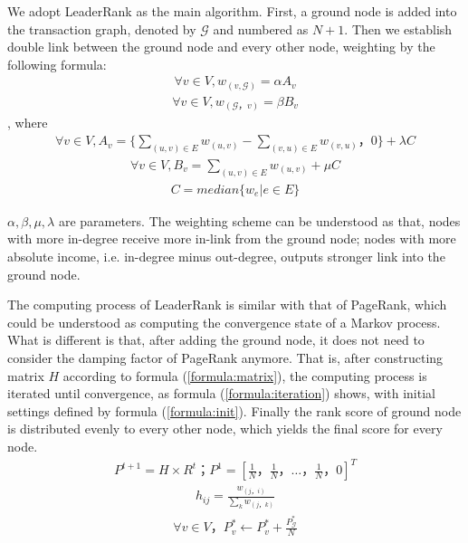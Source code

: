 We adopt LeaderRank\cite{Chen2013}\cite{Li2014} as the main algorithm. First, a ground node is added into the transaction graph, denoted by $\mathcal{G}$ and numbered as $N+1$. Then we establish double link between the ground node and every other node, weighting by the following formula:
\begin{align}\label{formula:weight1}
	\forall v \in V, w_{(v, \mathcal{G})} = \alpha A_v
\end{align}
\begin{align}\label{formula:weight2}
\forall v \in V,  w_{(\mathcal{G}， v)} = \beta B_v
\end{align}
, where 
\begin{align}
	\forall v \in V, A_v = \{ \sum_{(u,v)\in E} w_{(u,v)} - \sum_{(v,u) \in E} w_{(v, u)}， 0 \} + \lambda C
\end{align}
\begin{align} \label{formula:b}
\forall v \in V,  B_v =  \sum_{(u,v) \in E} w_{(u,v)} + \mu C
\end{align}
\begin{align}
	C = median\{w_e| e \in E\}
\end{align}

$\alpha, \beta, \mu, \lambda$ are parameters. The weighting scheme can be understood as that, nodes with more in-degree receive more in-link from the ground node; nodes with more absolute income, i.e. in-degree minus out-degree, outputs stronger link into the ground node. 

The computing process of LeaderRank is similar with that of PageRank, which could be understood as computing the convergence state of a Markov process. What is different is that, after adding the ground node, it does not need to consider the damping factor of PageRank\cite{Brin2010}\cite{page1999pagerank} anymore. That is, after constructing matrix $H$ according to formula (\ref{formula:matrix}), the computing process is iterated until convergence, as formula (\ref{formula:iteration}) shows, with initial settings defined by formula (\ref{formula:init}). Finally the rank score of ground node is distributed evenly to every other node, which yields the final score for every node.
\begin{align} \label{formula:iteration}
	P^{t+1} = H \times R^{t}； P^1=[\frac{1}{N}， \frac{1}{N}， \dots， \frac{1}{N}， 0]^T
\end{align}
\begin{align} \label{formula:matrix}
	h_{ij} = \frac{w_{(j，i)}}{\sum_k w_{(j，k)}}
\end{align}
\begin{align} \label{formula:init}
\forall v \in V， P^*_v \leftarrow P^*_v + \frac{P^*_{\mathcal{G}}}{N}
\end{align}

